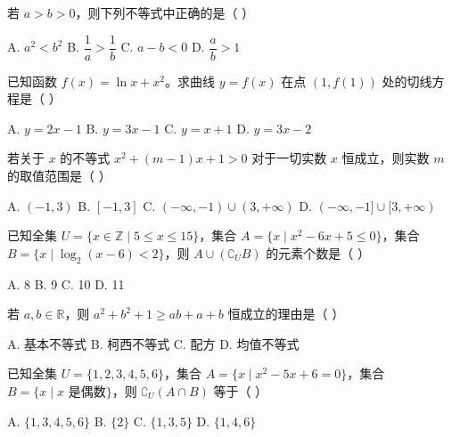 \documentclass[11pt, a4paper]{article}
\begin{document}
\begin{baitap}[32]
若 $a > b > 0$，则下列不等式中正确的是（ ）
\par\vspace{3pt}
\noindent A. $a^2 < b^2$ \quad B. $\dfrac{1}{a} > \dfrac{1}{b}$ \quad C. $a - b < 0$ \quad D. $\dfrac{a}{b} > 1$
\end{baitap}

\begin{baitap}[33]
已知函数 $f(x) = \ln x + x^2$。求曲线 $y = f(x)$ 在点 $(1, f(1))$ 处的切线方程是（ ）
\par\vspace{3pt}
\noindent A. $y = 2x - 1$ \quad B. $y = 3x - 1$ \quad C. $y = x + 1$ \quad D. $y = 3x - 2$
\end{baitap}

\begin{baitap}[34]
若关于 $x$ 的不等式 $x^2 + (m-1)x + 1 > 0$ 对于一切实数 $x$ 恒成立，则实数 $m$ 的取值范围是（ ）
\par\vspace{3pt}
\noindent A. $(-1,3)$ \quad B. $[-1,3]$ \quad C. $(-\infty,-1) \cup (3,+\infty)$ \quad D. $(-\infty,-1] \cup [3,+\infty)$
\end{baitap}

\begin{baitap}[35]
已知全集 $U = \{x \in \mathbb{Z} \mid 5 \le x \le 15\}$，集合 $A = \{x \mid x^2 - 6x + 5 \le 0\}$，集合 $B = \{x \mid \log_2(x-6) < 2\}$，则 $A \cup (\complement_U B)$ 的元素个数是（ ）
\par\vspace{3pt}
\noindent A. 8 \quad B. 9 \quad C. 10 \quad D. 11
\end{baitap}

\begin{baitap}[36]
若 $a, b \in \mathbb{R}$，则 $a^2 + b^2 + 1 \ge ab + a + b$ 恒成立的理由是（ ）
\par\vspace{3pt}
\noindent A. 基本不等式 \quad B. 柯西不等式 \quad C. 配方 \quad D. 均值不等式
\end{baitap}

\begin{baitap}[37]
已知全集 $U = \{1,2,3,4,5,6\}$，集合 $A = \{x \mid x^2 - 5x + 6 = 0\}$，集合 $B = \{x \mid x \text{ 是偶数}\}$，则 $\complement_U (A \cap B)$ 等于（ ）
\par\vspace{3pt}
\noindent A. $\{1,3,4,5,6\}$ \quad B. $\{2\}$ \quad C. $\{1,3,5\}$ \quad D. $\{1,4,6\}$
\end{baitap}
\end{document}
